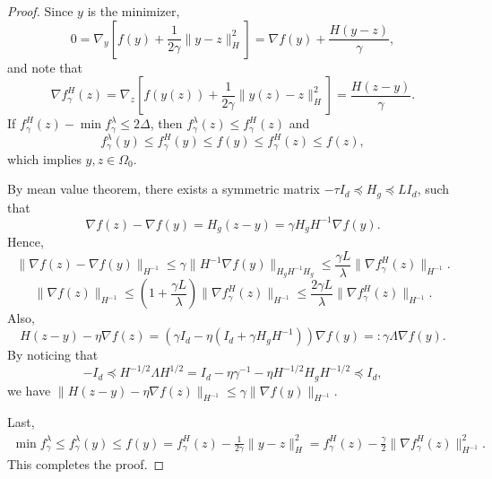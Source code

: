 \documentclass{article} %
\numberwithin{equation}{section}
\begin{document}
\begin{proof}
    Since $y$ is the minimizer, 
    \begin{equation}
        0 = \nabla_y \left[f(y)+\frac{1}{2\gamma}\|y-z\|_H^2\right] = \nabla f(y) + \frac{H(y-z)}{\gamma},
    \end{equation}
    and note that
    \begin{equation}
        \nabla f_\gamma^H (z) = \nabla_z \left[f(y(z))+\frac{1}{2\gamma}\|y(z)-z\|_H^2\right] = \frac{H(z-y)}{\gamma}.
    \end{equation}
    If $f_\gamma^H(z)-\min f_\gamma^\lambda\leq 2\Delta$,
    then $f_\gamma^\lambda(z)\leq f_\gamma^H(z)$ and
    \begin{equation}
        f_\gamma^\lambda(y)\leq f_\gamma^H(y)\leq f(y) \leq f_\gamma^H(z) \leq f(z),
    \end{equation}
    which implies $y,z\in \Omega_0$.
    
    By mean value theorem, there exists a symmetric matrix $-\tau I_d \preceq H_g \preceq L I_d$, such that
    \begin{equation}
        \nabla f(z) - \nabla f(y) = H_g(z-y) = \gamma H_gH^{-1} \nabla f(y).
    \end{equation}
    Hence,
    \begin{equation}
        \|\nabla f(z) - \nabla f(y)\|_{H^{-1}}
        \leq \gamma \|H^{-1}\nabla f(y) \|_{H_gH^{-1}H_g}
        \leq \frac{\gamma L}{\lambda} \|\nabla f_\gamma^H(z)\|_{H^{-1}}.
    \end{equation}
    \begin{equation}
        \|\nabla f(z)\|_{H^{-1}}\leq (1+\frac{\gamma L}{\lambda}) \|\nabla f_\gamma^H(z)\|_{H^{-1}}\leq \frac{2\gamma L}{\lambda} \|\nabla f_\gamma^H(z)\|_{H^{-1}}.
    \end{equation}
    Also,
    \begin{equation}
        H(z-y)-\eta \nabla f(z) = (\gamma I_d-\eta(I_d+\gamma H_gH^{-1}))\nabla f(y) =: \gamma \Lambda\nabla f(y).
    \end{equation}
    By noticing that 
    \begin{equation}
        -I_d\preceq H^{-1/2}\Lambda H^{1/2} = I_d - \eta\gamma^{-1} - \eta H^{-1/2}H_gH^{-1/2} \preceq I_d,
    \end{equation}
    we have $\|H(z-y)-\eta \nabla f(z)\|_{H^{-1}}\leq \gamma\|\nabla f(y)\|_{H^{-1}}$.
    
    Last, 
    \begin{equation}
        \begin{aligned}
            \min f_\gamma^\lambda\leq f_\gamma^\lambda(y)\leq f(y) = f_\gamma^H(z) - \frac{1}{2\gamma}\|y-z\|_H^2 = f_\gamma^H(z)-\frac{\gamma}{2}\|\nabla f_\gamma^H(z)\|_{H^{-1}}^2. 
        \end{aligned}
    \end{equation}
    This completes the proof.
\end{proof}
\end{document}
